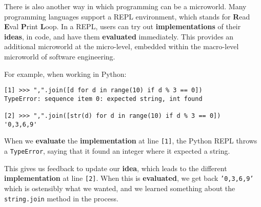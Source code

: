 There is also another way in which programming can be a microworld. Many programming languages support a REPL environment, which stands for \textbf{R}ead \textbf{E}val \textbf{P}rint \textbf{L}oop. In a REPL, users can try out \textbf{implementations} of their \textbf{ideas}, in code, and have them \textbf{evaluated} immediately. This provides an additional microworld at the micro-level, embedded within the macro-level microworld of software engineering.

For example, when working in Python:

\begin{verbatim}
[1] >>> ",".join([d for d in range(10) if d % 3 == 0])
TypeError: sequence item 0: expected string, int found

[2] >>> ",".join([str(d) for d in range(10) if d % 3 == 0])
'0,3,6,9'
\end{verbatim}

When we \textbf{evaluate} the \textbf{implementation} at line \texttt{[1]}, the Python REPL throws a \texttt{TypeError}, saying that it found an integer where it expected a string. 

This gives us feedback to update our \textbf{idea}, which leads to the different \textbf{implementation} at line \texttt{[2]}. When this is \textbf{evaluated}, we get back \texttt{'0,3,6,9'} which is ostensibly what we wanted, and we learned something about the \texttt{string.join} method in the process.
